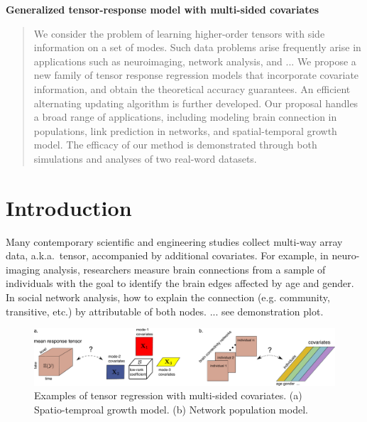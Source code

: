 \documentclass[11pt]{article}
\theoremstyle{plain}
\theoremstyle{definition}
\begin{document}
\begin{center}
\begin{spacing}{1.5}
\textbf{\Large Generalized tensor-response model with multi-sided covariates}
\end{spacing}
\end{center}


\begin{abstract}
We consider the problem of learning higher-order tensors with side information on a set of modes. Such data problems arise frequently arise in applications such as neuroimaging, network analysis, and ... We propose a new family of tensor response regression models that incorporate covariate information, and obtain the theoretical accuracy guarantees. An efficient alternating updating algorithm is further developed. Our proposal handles a broad range of applications, including modeling brain connection in populations, link prediction in networks, and spatial-temporal growth model. The efficacy of our method is demonstrated through both simulations and analyses of two real-word datasets. 
\end{abstract}

\section{Introduction}

Many contemporary scientific and engineering studies collect multi-way array data, a.k.a.\ tensor, accompanied by additional covariates. For example, in neuro-imaging analysis, researchers measure brain connections from a sample of individuals with the goal to identify the brain edges affected by age and gender. In social network analysis, how to explain the connection (e.g. community, transitive, etc.) by attributable of both nodes. ... see demonstration plot. 

\begin{figure}[H]
\begin{center}
\includegraphics[width=17cm]{figures/demo.pdf}
  \end{center}
\caption{Examples of tensor regression with multi-sided covariates. (a) Spatio-temproal growth model. (b) Network population model.}
  \end{figure}
\end{document}
